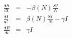 \documentclass[12pt]{article}
\begin{document}
\begin{eqnarray*}
%
	\frac{dS}{dt}  &=&  - \beta(N) \frac{SI}{N} \\
	\frac{dI}{dt}  &=& \beta(N) \frac{SI}{N}- \gamma I \\
	\frac{dR}{dt}  &=& \gamma I
%
\end{eqnarray*}
%
\end{document}
